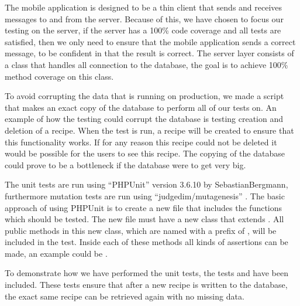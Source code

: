 The mobile application is designed to be a thin client that sends and receives messages to and from the server. 
Because of this, we have chosen to focus our testing on the server, if the server has a 100\% code coverage and all tests are satisfied, then we only need to ensure that the mobile application sends a correct message, to be confident in that the result is correct.
The server layer consists of a class that handles all connection to the database, the goal is to achieve 100\% method coverage on this class.

To avoid corrupting the data that is running on production, we made a script that makes an exact copy of the database to perform all of our tests on. An example of how the testing could corrupt the database is testing creation and deletion of a recipe.
When the test is run, a recipe will be created to ensure that this functionality works. 
If for any reason this recipe could not be deleted it would be possible for the users to see this recipe. 
The copying of the database could prove to be a bottleneck if the database were to get very big.

The unit tests are run using ``PHPUnit'' version 3.6.10 by Sebastian\linebreak Bergmann\cite{phpunit}, furthermore mutation tests are run using ``judgedim/mutagenesis'' \cite{mutagenesis}. The basic approach of using PHPUnit is to create a new file that includes the functions which should be tested. The new file must have a new class that extends . All public methods in this new class, which are named with a prefix of , will be included in the test. Inside each of these methods all kinds of assertions can be made, an example could be .

To demonstrate how we have performed the unit tests, the tests \linebreak{} and  have been included. These tests ensure that after a new recipe is written to the database, the exact same recipe can be retrieved again with no missing data.

